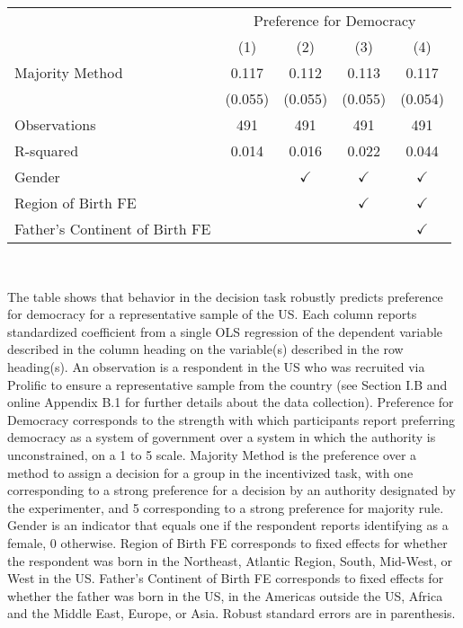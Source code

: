 \documentclass[]{article}
\begin{document}
\begin{tabular}{l*{4}{c}}
\hline\hline
                &\multicolumn{4}{c}{Preference for Democracy}\\\cmidrule(lr){2-5}
                &\multicolumn{1}{c}{(1)}&\multicolumn{1}{c}{(2)}&\multicolumn{1}{c}{(3)}&\multicolumn{1}{c}{(4)}\\
\hline
Majority Method       &    0.117&    0.112&    0.113&    0.117\\
                &  (0.055)&  (0.055)&  (0.055)&  (0.054)\\
\hline
Observations    &  491&  491&  491&  491\\
R-squared       &    0.014&    0.016&    0.022&    0.044\\
\hline
Gender          &         &$\checkmark$&$\checkmark$&$\checkmark$\\
Region of Birth FE&         &         &$\checkmark$&$\checkmark$\\
Father's Continent of Birth FE&         &         &         &$\checkmark$\\
\hline\hline        
\end{tabular}            
\\
\begin{adjustwidth}{-1cm}{-1cm}             
    \begin{scriptsize}        
    The table shows that behavior in the decision task robustly predicts preference for democracy for a representative sample of the US. Each column reports standardized coefficient from a single OLS regression of the dependent variable described in the column heading on the variable(s) described in the row heading(s). An observation is a respondent in the US who was recruited via Prolific to ensure a representative sample from the country (see Section I.B and online Appendix B.1 for further details about the data collection). Preference for Democracy corresponds to the strength with which participants report preferring democracy as a system of government over a system in which the authority is unconstrained, on a 1 to 5 scale. Majority Method is the preference over a method to assign a decision for a group in the incentivized task, with one corresponding to a strong preference for a decision by an authority designated by the experimenter, and 5 corresponding to a strong preference for majority rule. Gender is an indicator that equals one if the respondent reports identifying as a female, 0 otherwise. Region of Birth FE corresponds to fixed effects for whether the respondent was born in the Northeast, Atlantic Region, South, Mid-West, or West in the US. Father's Continent of Birth FE corresponds to fixed effects for whether the father was born in the US, in the Americas outside the US, Africa and the Middle East, Europe, or Asia. Robust standard errors are in parenthesis.        
    \end{scriptsize} 
\end{adjustwidth}
\end{document}
